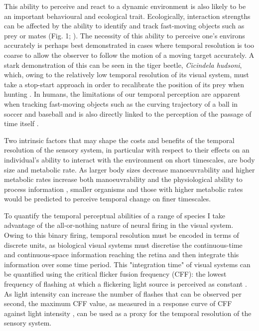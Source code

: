 This ability to perceive and react to a dynamic environment is also likely to be an important behavioural and ecological trait. Ecologically, interaction strengths can be affected by the ability to identify and track fast-moving objects such as prey or mates (Fig. 1; \citealt{land1974chasing, fritsches2005warm}). The necessity of this ability to perceive one's environs accurately is perhaps best demonstrated in cases where temporal resolution is too coarse to allow the observer to follow the motion of a moving target accurately. A stark demonstration of this can be seen in the tiger beetle, \textit{Cicindela hudsoni}, which, owing to the relatively low temporal resolution of its visual system, must take a stop-start approach in order to recalibrate the position of its prey when hunting \citep{gilbert1997visual}. In humans, the limitations of our temporal perception are apparent when tracking fast-moving objects such as the curving trajectory of a ball in soccer \citep{dessing2010bending} and baseball \citep{bahill2004rising} and is also directly linked to the perception of the passage of time itself \citep{hagura2012ready}. 

Two intrinsic factors that may shape the costs and benefits of the temporal resolution of the sensory system, in particular with respect to their effects on an individual's ability to interact with the environment on short timescales, are body size and metabolic rate. As larger body sizes decrease manoeuvrability \citep{heglund1988speed,dudley2002mechanisms,biewener2003animal,sato2007stroke,vogel2008modes,hedrick2011damping,watanabe2012slowest} and higher metabolic rates increase both manoeuvrability and the physiological ability to process information \citep{li2008optimal,franz2002temperature}, smaller organisms and those with higher metabolic rates would be predicted to perceive temporal change on finer timescales.

To quantify the temporal perceptual abilities of a range of species I take advantage of the all-or-nothing nature of neural firing in the visual system. Owing to this binary firing, temporal resolution must be encoded in terms of discrete units, as biological visual systems must discretise the continuous-time and continuous-space information reaching the retina and then integrate this information over some time period. This "integration time" of visual systems can be quantified using the critical flicker fusion frequency (CFF): the lowest frequency of flashing at which a flickering light source is perceived as constant \citep{d1998can,schwartz2010visual}. As light intensity can increase the number of flashes that can be observed per second, the maximum CFF value, as measured in a response curve of CFF against light intensity \citep{ferry1892persistence,porter1902contributions}, can be used as a proxy for the temporal resolution of the sensory system.

